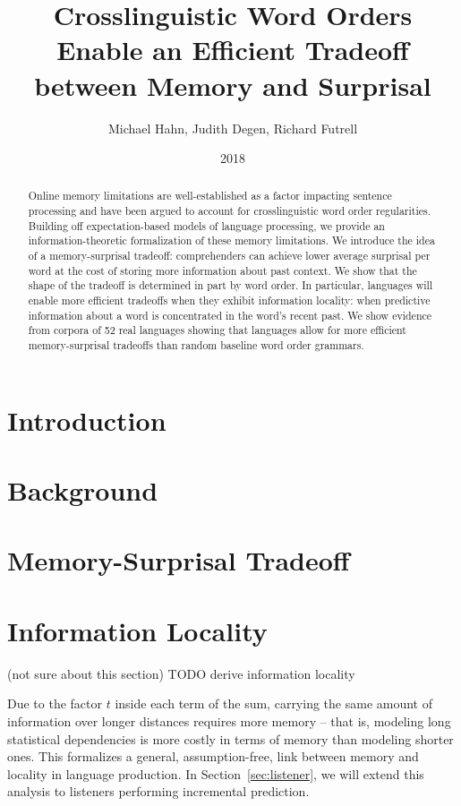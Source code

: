 \documentclass[11pt,letterpaper]{article}
\title{Crosslinguistic Word Orders Enable an Efficient Tradeoff between Memory and Surprisal}
\author{Michael Hahn, Judith Degen, Richard Futrell}
\date{2018}
\newcommand\mhahn[1]{{\color{red}(#1)}}
\begin{document}
\maketitle


\begin{abstract}
Online memory limitations are well-established as a factor impacting sentence processing and have been argued to account for crosslinguistic word order regularities. Building off expectation-based models of language processing, we provide an information-theoretic formalization of these memory limitations. We introduce the idea of a memory-surprisal tradeoff: comprehenders can achieve lower average surprisal per word at the cost of storing more information about past context. We show that the shape of the tradeoff is determined in part by word order. In particular, languages will enable more efficient tradeoffs when they exhibit information locality: when predictive information about a word is concentrated in the word’s recent past. We show evidence from corpora of 52 real languages showing that languages allow for more efficient memory-surprisal tradeoffs than random baseline word order grammars. 
\end{abstract}


 
\section{Introduction}




\section{Background}\label{sec:background}




\section{Memory-Surprisal Tradeoff}\label{sec:ms-tradeoff}




\section{Information Locality}\label{sec:info-locality}
\mhahn{not sure about this section}
TODO derive information locality

Due to the factor $t$ inside each term of the sum, carrying the same amount of information over longer distances requires more memory -- that is, modeling long statistical dependencies is more costly in terms of memory than modeling shorter ones.
This formalizes a general, assumption-free, link between memory and locality in language production.
In Section~\ref{sec:listener}, we will extend this analysis to listeners performing incremental prediction.
\end{document}

